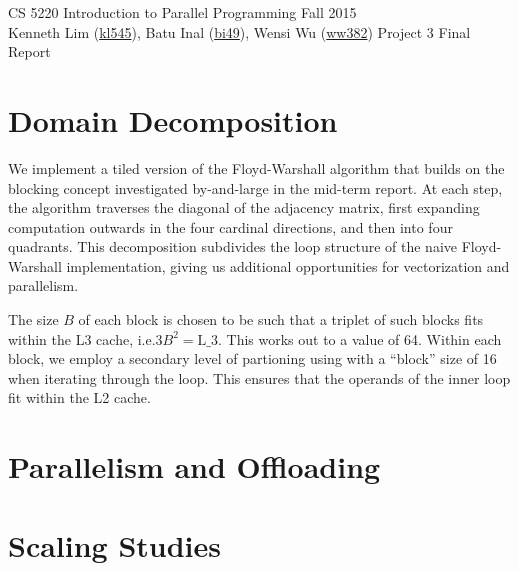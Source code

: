 \documentclass{scrartcl}
\begin{document}
  \begin{framed}
  CS 5220 Introduction to Parallel Programming \hfill Fall 2015 \\
  Kenneth Lim (\href{mailto:kl545@cornell.edu}{kl545}), Batu Inal (\href{mailto:bi49@cornell.edu}{bi49}), Wensi Wu (\href{mailto:ww382@cornell.edu}{ww382}) \hfill Project 3 Final Report\hspace{-3ex}
  \end{framed}
  \section{Domain Decomposition}
  We implement a tiled version of the Floyd-Warshall algorithm that builds on the blocking concept investigated by-and-large in the mid-term report. At each step, the algorithm traverses the diagonal of the adjacency matrix, first expanding computation outwards in the four cardinal directions, and then into four quadrants. This decomposition subdivides the loop structure of the naive Floyd-Warshall implementation, giving us additional opportunities for vectorization and parallelism.

  The size $B$ of each block is chosen to be such that a triplet of such blocks fits within the L3 cache, i.e.$3B^2 = \textrm{L_3}$. This works out to a value of 64. Within each block, we employ a secondary level of partioning using with a ``block'' size of 16 when iterating through the loop. This ensures that the operands of the inner loop fit within the L2 cache.


  \section{Parallelism and Offloading}
  \section{Scaling Studies}
\end{document}
